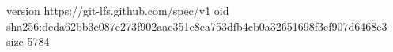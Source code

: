 version https://git-lfs.github.com/spec/v1
oid sha256:deda62bb3e087e273f902aac351c8ea753dfb4cb0a32651698f3ef907d6468e3
size 5784
